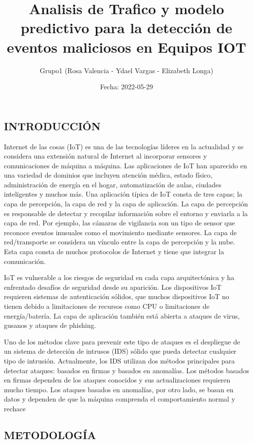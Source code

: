 \documentclass[
  10pt,
]{article}
\title{Analisis de Trafico y modelo predictivo para la detección de
eventos maliciosos en Equipos IOT}
\author{Grupo1 (Rosa Valencia - Ydael Vargas - Elizabeth Longa)}
\date{Fecha: 2022-05-29}
\begin{document}
\maketitle

\hypertarget{introducciuxf3n}{%
\subsection{\texorpdfstring{\textbf{INTRODUCCIÓN}}{INTRODUCCIÓN}}\label{introducciuxf3n}}

Internet de las cosas (IoT) es una de las tecnologías líderes en la
actualidad y se considera una extensión natural de Internet al
incorporar sensores y comunicaciones de máquina a máquina. Las
aplicaciones de IoT han aparecido en una variedad de dominios que
incluyen atención médica, estado físico, administración de energía en el
hogar, automatización de aulas, ciudades inteligentes y muchos más. Una
aplicación típica de IoT consta de tres capas; la capa de percepción, la
capa de red y la capa de aplicación. La capa de percepción es
responsable de detectar y recopilar información sobre el entorno y
enviarla a la capa de red. Por ejemplo, las cámaras de vigilancia son un
tipo de sensor que reconoce eventos inusuales como el movimiento
mediante sensores. La capa de red/transporte se considera un vínculo
entre la capa de percepción y la nube. Esta capa consta de muchos
protocolos de Internet y tiene que integrar la comunicación.

IoT es vulnerable a los riesgos de seguridad en cada capa arquitectónica
y ha enfrentado desafíos de seguridad desde su aparición. Los
dispositivos IoT requieren sistemas de autenticación sólidos, que muchos
dispositivos IoT no tienen debido a limitaciones de recursos como CPU o
limitaciones de energía/batería. La capa de aplicación también está
abierta a ataques de virus, gusanos y ataques de phishing.

Uno de los métodos clave para prevenir este tipo de ataques es el
despliegue de un sistema de detección de intrusos (IDS) sólido que pueda
detectar cualquier tipo de intrusión. Actualmente, los IDS utilizan dos
métodos principales para detectar ataques: basados en firmas y basados
en anomalías. Los métodos basados en firmas dependen de los ataques
conocidos y sus actualizaciones requieren mucho tiempo. Los ataques
basados en anomalías, por otro lado, se basan en datos y dependen de que
la máquina comprenda el comportamiento normal y rechace

\hypertarget{metodologuxeda}{%
\subsection{\texorpdfstring{\textbf{METODOLOGÍA}}{METODOLOGÍA}}\label{metodologuxeda}}
\end{document}
